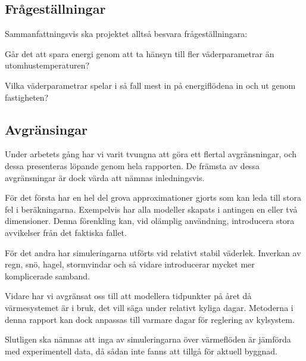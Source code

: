 \subsection{Frågeställningar}
Sammanfattningsvis ska projektet alltså besvara frågeställningara:

Går det att spara energi genom att ta hänsyn till fler väderparametrar än utomhustemperaturen?

Vilka väderparametrar spelar i så fall mest in på energiflödena in och ut genom fastigheten?

\subsection{Avgränsingar}
Under arbetets gång har vi varit tvungna att göra ett flertal avgränsningar, och dessa presenteras löpande genom hela rapporten. De främsta av dessa avgränsningar är dock värda att nämnas inledningsvis.

För det första har en hel del grova approximationer gjorts som kan leda till stora fel i beräkningarna. Exempelvis har alla modeller skapats i antingen en eller två dimensioner. Denna förenkling kan, vid olämplig användning, introducera stora avvikelser från det faktiska fallet.

För det andra har simuleringarna utförts vid relativt stabil väderlek. Inverkan av regn, snö, hagel, stormvindar och så vidare introducerar mycket mer komplicerade samband.

Vidare har vi avgränsat oss till att modellera tidpunkter på året då värmesystemet är i bruk, det vill säga under relativt kyliga dagar. Metoderna i denna rapport kan dock anpassas till varmare dagar för reglering av kylsystem.

Slutligen ska nämnas att inga av simuleringarna över värmeflöden är jämförda med experimentell data, då sådan inte fanns att tillgå för aktuell byggnad.

